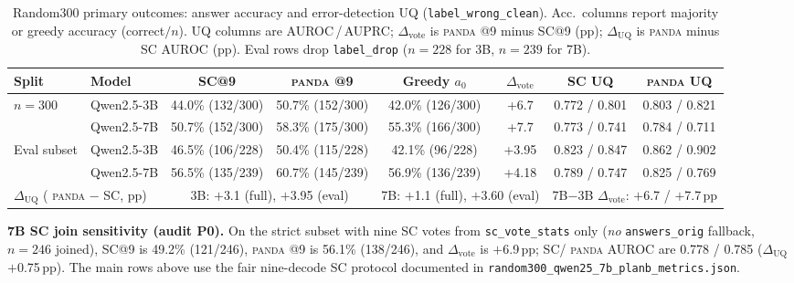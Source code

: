 \documentclass{article} %
\DeclareRobustCommand{\method}{%
  \texorpdfstring{%
    \ifmmode\text{\normalfont\textsc{panda}}\else\textsc{panda}\xspace\fi
  }{PANDA}%
}
\begin{document}
\begin{table}[htbp]
  \centering
  \footnotesize
  \setlength{\tabcolsep}{3.5pt}
  \renewcommand{\arraystretch}{1.05}
  \caption{Random300 primary outcomes: answer accuracy and error-detection UQ (\texttt{label\_wrong\_clean}).
  Acc.\ columns report majority or greedy accuracy (correct$/n$).
  UQ columns are AUROC\,/\,AUPRC; $\Delta_{\mathrm{vote}}$ is \method{}@9 minus SC@9 (pp); $\Delta_{\mathrm{UQ}}$ is \method{} minus SC AUROC (pp).
  Eval rows drop \texttt{label\_drop} ($n{=}228$ for 3B, $n{=}239$ for 7B).}
  \label{tab:random300-primary}
  \begin{tabular}{llcccccc}
    \toprule
    \rowcolor{headerpink}
    Split & Model & SC@9 & \method{}@9 & Greedy $a_0$ & $\Delta_{\mathrm{vote}}$ & SC UQ & \method{} UQ \\
    \midrule
    $n{=}300$
      & Qwen2.5-3B
      & 44.0\% (132/300) & 50.7\% (152/300) & 42.0\% (126/300) & +6.7 & 0.772 / 0.801 & 0.803 / 0.821 \\
    \rowcolor{rowgray}
      & Qwen2.5-7B
      & 50.7\% (152/300) & 58.3\% (175/300) & 55.3\% (166/300) & +7.7 & 0.773 / 0.741 & 0.784 / 0.711 \\
    \midrule
    Eval subset
      & Qwen2.5-3B
      & 46.5\% (106/228) & 50.4\% (115/228) & 42.1\% (96/228) & +3.95 & 0.823 / 0.847 & 0.862 / 0.902 \\
    \rowcolor{rowgray}
      & Qwen2.5-7B
      & 56.5\% (135/239) & 60.7\% (145/239) & 56.9\% (136/239) & +4.18 & 0.789 / 0.747 & 0.825 / 0.769 \\
    \midrule
    \multicolumn{2}{l}{$\Delta_{\mathrm{UQ}}$ (\method{} $-$ SC, pp)}
      & \multicolumn{2}{c}{3B: $+$3.1 (full), $+$3.95 (eval)}
      & \multicolumn{2}{c}{7B: $+$1.1 (full), $+$3.60 (eval)}
      & \multicolumn{2}{c}{7B$-$3B $\Delta_{\mathrm{vote}}$: $+$6.7 / $+$7.7\,pp} \\
    \bottomrule
  \end{tabular}
\end{table}

\noindent\textbf{7B SC join sensitivity (audit P0).}
On the strict subset with nine SC votes from \texttt{sc\_vote\_stats} only (\emph{no} \texttt{answers\_orig} fallback, $n{=}246$ joined), SC@9 is 49.2\% (121/246), \method{}@9 is 56.1\% (138/246), and $\Delta_{\mathrm{vote}}$ is $+$6.9\,pp; SC/\method{} AUROC are 0.778 / 0.785 ($\Delta_{\mathrm{UQ}}$ $+$0.75\,pp).
The main rows above use the fair nine-decode SC protocol documented in \texttt{random300\_qwen25\_7b\_planb\_metrics.json}.
\end{document}
